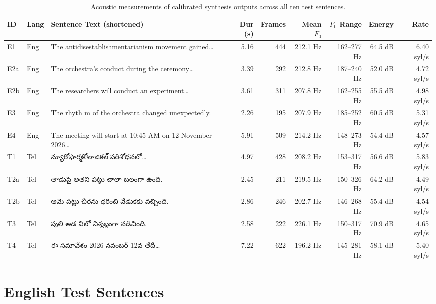 \documentclass[11pt,a4paper]{report}
\newcommand{\texttelugu}[1]{{\telugufont #1}}
\begin{document}
\begin{table}[!htbp]
\centering
\caption{Acoustic measurements of calibrated synthesis outputs across all ten test sentences.}
\label{tab:eval_metrics}
\scriptsize
\begin{tabularx}{\textwidth}{llXrrrrrr}
\toprule
\textbf{ID} & \textbf{Lang} & \textbf{Sentence Text (shortened)} & \textbf{Dur (s)} & \textbf{Frames} & \textbf{Mean $F_0$} & \textbf{$F_0$ Range} & \textbf{Energy} & \textbf{Rate} \\
\midrule
E1 & Eng & The antidisestablishmentarianism movement gained\ldots & 5.16 & 444 & 212.1 Hz & 162--277 Hz & 64.5 dB & 6.40 syl/s \\
E2a & Eng & The orchestra's conduct during the ceremony\ldots & 3.39 & 292 & 212.8 Hz & 187--240 Hz & 52.0 dB & 4.72 syl/s \\
E2b & Eng & The researchers will conduct an experiment\ldots & 3.61 & 311 & 207.8 Hz & 162--255 Hz & 55.5 dB & 4.98 syl/s \\
E3 & Eng & The rhyth  m of the orchestra changed unexpectedly. & 2.26 & 195 & 207.9 Hz & 185--252 Hz & 60.5 dB & 5.31 syl/s \\
E4 & Eng & The meeting will start at 10:45 AM on 12 November 2026\ldots & 5.91 & 509 & 214.2 Hz & 148--273 Hz & 54.4 dB & 4.57 syl/s \\
\midrule
T1 & Tel & \texttelugu{న్యూరోఫార్మకోలాజికల్ పరిశోధనలో\ldots} & 4.97 & 428 & 208.2 Hz & 153--317 Hz & 56.6 dB & 5.83 syl/s \\
T2a & Tel & \texttelugu{తాడుపై అతని పట్టు చాలా బలంగా ఉంది.} & 2.45 & 211 & 219.5 Hz & 150--326 Hz & 64.2 dB & 4.49 syl/s \\
T2b & Tel & \texttelugu{ఆమె పట్టు చీరను ధరించి వేడుకకు వచ్చింది.} & 2.86 & 246 & 202.7 Hz & 146--268 Hz & 55.4 dB & 4.54 syl/s \\
T3 & Tel & \texttelugu{పులి అడ  విలో నిశ్శబ్దంగా నడిచింది.} & 2.58 & 222 & 226.1 Hz & 150--317 Hz & 70.9 dB & 4.65 syl/s \\
T4 & Tel & \texttelugu{ఈ సమావేశం 2026 నవంబర్ 12వ తేదీ\ldots} & 7.22 & 622 & 196.2 Hz & 145--281 Hz & 58.1 dB & 5.40 syl/s \\
\bottomrule
\end{tabularx}
\end{table}

\section{English Test Sentences}
\end{document}

